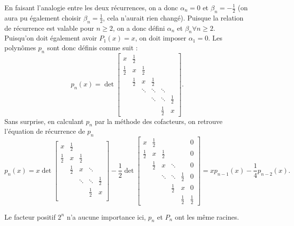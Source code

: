En faisant l'analogie entre les deux récurrences,
on a donc $\alpha_n = 0$ et $\beta_n = -\frac{1}{2}$
(on aura pu également choisir $\beta_n = \frac{1}{2}$,
cela n'aurait rien changé).
Puisque la relation de récurrence est valable pour $n \geq 2$, on a donc défini $\alpha_n$ et $\beta_n \forall n \geq 2$.\\ Puisqu'on doit également avoir $P_1(x) = x$, on doit imposer $\alpha_1 = 0$. Les polynômes $p_n$ sont donc définis comme suit :
$$
p_n(x) = \det
\left[
  \begin{array}{cccccc}
    x & \frac{1}{2} & & & &  \\
    \frac{1}{2} & x & \frac{1}{2} & & & \\
      & \frac{1}{2} & x & \frac{1}{2} & & \\
      & & \ddots & \ddots & \ddots & \\
      & & & \ddots & \ddots &  \frac{1}{2}\\
      & & & &  \frac{1}{2} & x
  \end{array}
\right].
$$
Sans surprise, en calculant $p_n$ par la méthode des cofacteurs, on retrouve l'équation de récurrence de $p_n$
$$
p_n(x) = x \det
\left[
\begin{array}{ccccc}
x & \frac 12 & & &  \\
  \frac 12 & x & \frac 12 & & \\
 & \frac 12 & x & \ddots & \\
 & & \ddots & \ddots & \frac 12  \\
 & & & \frac 12 & x   \\
\end{array}
\right] - \frac 12\det
\left[
\begin{array}{cccccc}
x & \frac 12 & & & & 0 \\
\frac 12 & x & \frac 12 & & & 0\\
 & \frac 12 & x & \ddots & & 0\\
 & & \ddots & \ddots & \frac 12 & 0\\
 & & & \frac 12 & x &  0\\
 & & & &  \frac 12 &  \frac 12
\end{array}
\right] = xp_{n-1}(x)-\frac{1}{4}p_{n-2}(x).
$$

Le facteur positif $2^n$ n'a aucune importance ici,
$p_n$ et $P_n$ ont les même racines.

